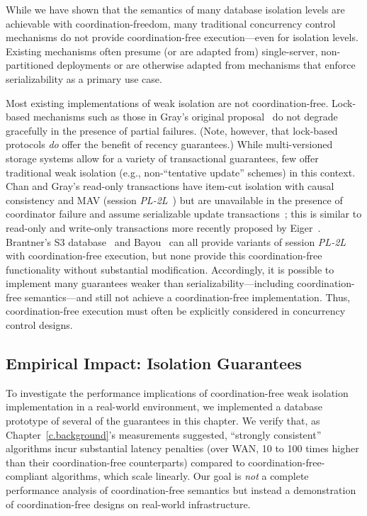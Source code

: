 While we have shown that the semantics of many database isolation
levels are achievable with coordination-freedom, many traditional
concurrency control mechanisms do not provide coordination-free
execution---even for \iconfluent isolation levels. Existing mechanisms
often presume (or are adapted from) single-server, non-partitioned
deployments or are otherwise adapted from mechanisms that enforce
serializability as a primary use case.

Most existing implementations of weak isolation are not
coordination-free. Lock-based mechanisms such as those in Gray's
original proposal~\cite{gray-isolation} do not degrade gracefully in
the presence of partial failures. (Note, however, that lock-based
protocols \textit{do} offer the benefit of recency guarantees.) While
multi-versioned storage systems allow for a variety of transactional
guarantees, few offer traditional weak isolation (e.g.,
non-``tentative update'' schemes) in this context.  Chan and Gray's
read-only transactions have item-cut isolation with causal consistency
and MAV (session \textit{PL-2L}~\cite{adya}) but are unavailable in
the presence of coordinator failure and assume serializable update
transactions~\cite{readonly}; this is similar to read-only and
write-only transactions more recently proposed by Eiger~\cite{eiger}.
Brantner's S3 database~\cite{kraska-s3} and
Bayou~\cite{sessionguarantees} can all provide variants of session
\textit{PL-2L} with coordination-free execution, but none provide this
coordination-free functionality without substantial
modification. Accordingly, it is possible to implement many guarantees
weaker than serializability---including coordination-free
semantics---and still not achieve a coordination-free
implementation. Thus, coordination-free execution must often be
explicitly considered in concurrency control designs.

\subsection{Empirical Impact: Isolation Guarantees}
\label{sec:prototype}

To investigate the performance implications of coordination-free weak
isolation implementation in a real-world environment, we implemented a
database prototype of several of the guarantees in this chapter. We
verify that, as Chapter~\ref{c.background}'s measurements suggested,
``strongly consistent'' algorithms incur substantial latency penalties
(over WAN, 10 to 100 times higher than their coordination-free
counterparts) compared to coordination-free-compliant algorithms,
which scale linearly. Our goal is \textit{not} a complete performance
analysis of coordination-free semantics but instead a demonstration of
coordination-free designs on real-world infrastructure.

